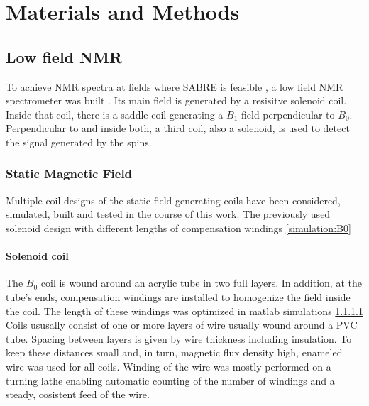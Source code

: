 \chapter{Materials and Methods}\label{chap:MaterialsAndMethods}
	\section{Low field NMR}
		To achieve NMR spectra at fields where SABRE is feasible , a low field NMR
		spectrometer was built . Its main field is generated by a resisitve solenoid
		coil. Inside that coil, there is a saddle coil
		generating a $B_1$ field perpendicular to $B_0$. Perpendicular to and inside both, a third
		coil, also a solenoid, is used to detect the signal generated by the spins.
		\subsection{Static Magnetic Field}
		Multiple coil designs of the static field generating coils have been  considered, simulated, built and tested in the course of this work. The previously used solenoid design with different lengths of compensation windings \ref{simulation:B0}
		\subsubsection{Solenoid coil}
			The $B_0$ coil is wound around an acrylic tube in two full layers. In addition, at the
			tube's ends, compensation windings are installed to homogenize the field inside the coil.
			The length of these windings was optimized in matlab simulations \ref{} 
			Coils ususally consist of one or more layers of wire usually wound around a PVC tube. Spacing between layers is given by wire thickness including insulation. To keep  these distances small and, in turn, magnetic flux density high, enameled wire was used for all coils. Winding of the wire was mostly performed on a turning lathe enabling automatic counting of the number of windings and a steady, cosistent feed of the wire.
